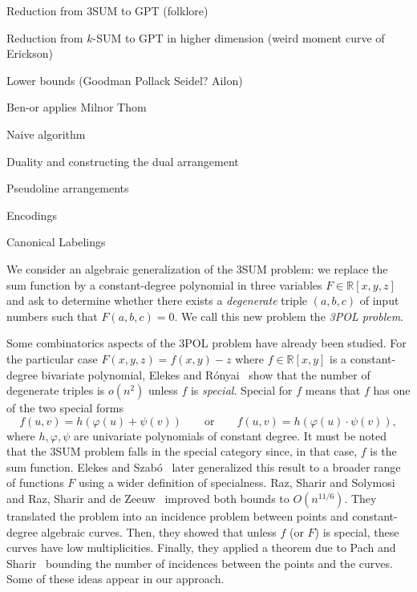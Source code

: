 Reduction from 3SUM to GPT (folklore)

Reduction from \(k\)-SUM to GPT in higher dimension (weird moment curve of Erickson)

Lower bounds (Goodman Pollack Seidel? Ailon)

Ben-or applies Milnor Thom

Naive algorithm

Duality and constructing the dual arrangement

Pseudoline arrangements

Encodings

Canonical Labelings


We consider an algebraic generalization of the 3SUM problem: we replace the sum
function by a constant-degree polynomial in three variables $F \in
\mathbb{R}[x,y,z]$ and ask to determine whether there exists a
\emph{degenerate} triple $(a,b,c)$ of input numbers such that $F(a,b,c)=0$. We
call this new problem the \emph{3POL problem}.



Some combinatorics aspects of the 3POL problem have already been studied.
%
For the particular case $F(x,y,z) = f(x,y) - z$ where $f \in \mathbb{R}[x,y]$
is a constant-degree bivariate polynomial, Elekes and Rónyai~\cite{ER00} show
that the number of degenerate triples is $o(n^2)$ unless $f$ is
\emph{special}. Special for $f$ means that $f$ has one of the two special forms
\begin{displaymath}
f(u,v)=h(\varphi(u)+\psi(v))
\qquad
\text{or}
\qquad
f(u,v)=h(\varphi(u)\cdot\psi(v)),
\end{displaymath}
where $h,\varphi,\psi$ are univariate polynomials of constant degree.
It must be noted that the 3SUM problem falls in the special category since, in
that case, \( f \) is the sum function.
%
Elekes and Szabó~\cite{ES12} later generalized this result to a broader range
of functions $F$ using a wider definition of specialness.
%
Raz, Sharir and Solymosi~\cite{RSS14} and Raz, Sharir and de Zeeuw~\cite{RSZ15}
improved both bounds to $O(n^{11/6})$.
%
They translated the problem into an incidence problem between points and
constant-degree algebraic curves. Then, they showed that unless $f$ (or $F$) is
special, these curves have low multiplicities. Finally, they applied a theorem
due to Pach and Sharir~\cite{PS98} bounding the number of incidences between
the points and the curves. Some of these ideas appear in our approach.


